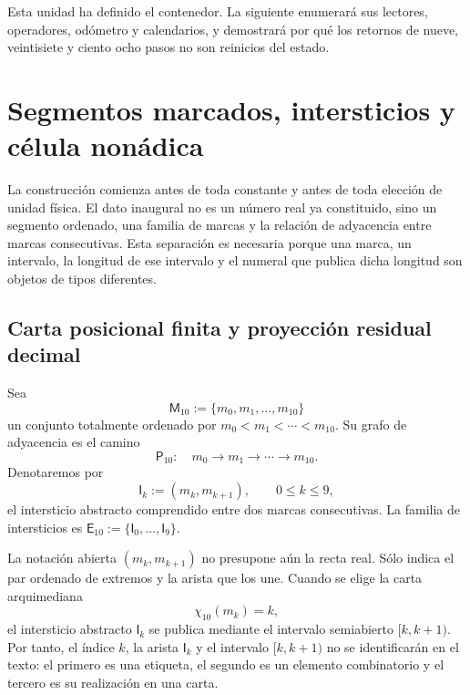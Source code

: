 {Esta unidad ha definido el contenedor. La siguiente enumerará sus lectores,
operadores, odómetro y calendarios, y demostrará por qué los retornos de
nueve, veintisiete y ciento ocho pasos no son reinicios del estado.
}%



\section{Segmentos marcados, intersticios y célula nonádica}
\label{p12-83-c1-s4:chap:segmentos-marcas-intersticios}

La construcción comienza antes de toda constante y antes de toda elección de
unidad física. El dato inaugural no es un número real ya constituido, sino un
segmento ordenado, una familia de marcas y la relación de adyacencia entre
marcas consecutivas. Esta separación es necesaria porque una marca, un
intervalo, la longitud de ese intervalo y el numeral que publica dicha
longitud son objetos de tipos diferentes.

\subsection{Carta posicional finita y proyección residual decimal}

\begin{definition}
Sea
\[
 \mathsf M_{10}:=\{m_0,m_1,\ldots,m_{10}\}
\]
un conjunto totalmente ordenado por
\(m_0<m_1<\cdots<m_{10}\). Su grafo de adyacencia es el camino
\[
 \mathsf P_{10}:\quad
 m_0\longrightarrow m_1\longrightarrow\cdots\longrightarrow m_{10}.
\]
Denotaremos por
\[
 \mathsf I_k:=(m_k,m_{k+1}),\qquad 0\leq k\leq9,
\]
el intersticio abstracto comprendido entre dos marcas consecutivas. La
familia de intersticios es
\(\mathsf E_{10}:=\{\mathsf I_0,\ldots,\mathsf I_9\}\).
\end{definition}

La notación abierta \((m_k,m_{k+1})\) no presupone aún la recta real. Sólo
indica el par ordenado de extremos y la arista que los une. Cuando se elige la
carta arquimediana
\[
 \chi_{10}(m_k)=k,
\]
el intersticio abstracto \(\mathsf I_k\) se publica mediante el intervalo
semiabierto \([k,k+1)\). Por tanto, el índice \(k\), la arista
\(\mathsf I_k\) y el intervalo \([k,k+1)\) no se identificarán en el texto:
el primero es una etiqueta, el segundo es un elemento combinatorio y el
tercero es su realización en una carta.

